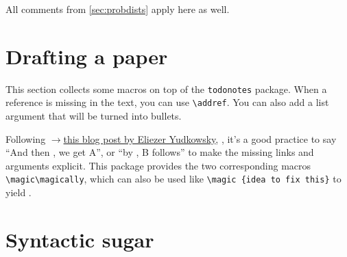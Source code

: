 \documentclass
[
twoside, %
]
{article}
\begin{document}
All comments from \cref{sec:probdists} apply here as well.

\section{Drafting a paper}
This section collects some macros on top of the \texttt{todonotes} package.
When a reference is missing in the text, you can use \texttt{\textbackslash addref}\addref.
You can also add a list argument that will be turned into bullets.

Following \href{http://lesswrong.com/lw/ix/say_not_complexity/}{$\rightarrow$this blog post by Eliezer Yudkowsky}, \cite{yudkowskyeliezerSayNotComplexity2007}, it's a good practice to say ``And then \magically, we get A'', or ``by \magic, B follows'' to make the missing links and arguments explicit.
This package provides the two corresponding macros \texttt{\textbackslash magic}\texttt{\textbackslash magically}, which can also be used like \texttt{\textbackslash magic \{idea to fix this\}} to yield .


\section{Syntactic sugar}
\end{document}
